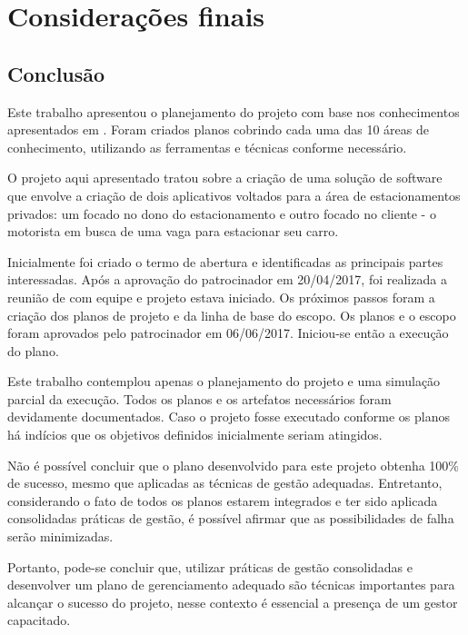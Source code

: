 \part{Considerações finais}

\chapter[Conclusão]{Conclusão}

Este trabalho apresentou o planejamento do projeto \projectName{} com base nos conhecimentos apresentados em \cite{project2013guia}. Foram criados planos cobrindo cada uma das 10 áreas de conhecimento, utilizando as ferramentas e técnicas conforme necessário. 

O projeto aqui apresentado tratou sobre a criação de uma solução de software que envolve a criação de dois aplicativos voltados para a área de estacionamentos privados: um focado no dono do estacionamento e outro focado no cliente - o motorista em busca de uma vaga para estacionar seu carro. 

Inicialmente foi criado o termo de abertura e identificadas as principais partes interessadas. Após a aprovação do patrocinador em 20/04/2017, foi realizada a reunião de  com equipe e projeto estava iniciado. Os próximos passos foram a criação dos planos de projeto e da linha de base do escopo. Os planos e o escopo foram aprovados pelo patrocinador em 06/06/2017. Iniciou-se então a execução do plano.

Este trabalho contemplou apenas o planejamento do projeto e uma simulação parcial da execução. Todos os planos e os artefatos necessários foram devidamente documentados. Caso o projeto fosse executado conforme os planos há indícios que os objetivos definidos inicialmente seriam atingidos.

Não é possível concluir que o plano desenvolvido para este projeto obtenha 100\% de sucesso, mesmo que aplicadas as técnicas de gestão adequadas. Entretanto, considerando o fato de todos os planos estarem integrados e ter sido aplicada consolidadas práticas de gestão, é possível afirmar que as possibilidades de falha serão minimizadas.

Portanto, pode-se concluir que, utilizar práticas de gestão consolidadas e desenvolver um plano de gerenciamento adequado são técnicas importantes para alcançar o sucesso do projeto, nesse contexto é essencial a presença de um gestor capacitado.


